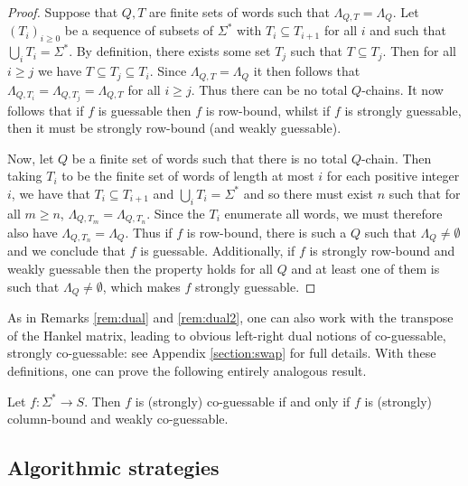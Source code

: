 \documentclass{lmcs}
\numberwithin{theorem}{section}
\begin{document}
\begin{proof} Suppose that $Q, T$ are finite sets of words such that $\Lambda_{Q, T}=\Lambda_{Q}$. Let $(T_i)_{i \geq0}$ be a sequence of subsets of $\Sigma^*$ with $T_i \subseteq T_{i+1}$ for all $i$ and such that $\bigcup_i T_i = \Sigma^*$. By definition, there exists some set $T_j$ such that $T \subseteq T_j$. Then for all $i\geq j$ we have $T \subseteq T_j \subseteq T_i$. Since $\Lambda_{Q, T}=\Lambda_{Q}$ it then follows that $\Lambda_{Q, T_i} = \Lambda_{Q, T_j} = \Lambda_{Q, T}$ for all $i \geq j$. Thus there can be no total $Q$-chains. It now follows that if $f$ is guessable then $f$ is row-bound, whilst if $f$ is strongly guessable, then it must be strongly row-bound (and weakly guessable).
	
	Now, let $Q$ be a finite set of words such that there is no total $Q$-chain. Then taking $T_i$ to be the finite set of words of length at most $i$  for each positive integer $i$, we have that $T_i \subseteq T_{i+1}$ and $\bigcup_i T_i = \Sigma^*$ and so there must exist $n$ such that for all $m\geq n$, $\Lambda_{Q, T_m} = \Lambda_{Q, T_n}$. Since the $T_i$ enumerate all words, we must therefore also have $\Lambda_{Q, T_n} = \Lambda_{Q}$.  Thus if $f$ is row-bound, there is such a $Q$ such that $\Lambda_Q \neq \emptyset$ and we conclude that $f$ is guessable. Additionally, if $f$ is strongly row-bound and weakly guessable then the property holds for all $Q$ and at least one of them is such that $\Lambda_Q \neq \emptyset$, which makes $f$ strongly guessable.
\end{proof} %

\begin{rem}
\label{rem:dual3}
As in Remarks \ref{rem:dual} and \ref{rem:dual2}, one can also work with the transpose of the Hankel matrix, leading to obvious left-right dual notions of co-guessable, strongly co-guessable: see Appendix \ref{section:swap} for full details. With these definitions, one can prove the following entirely analogous result.
\end{rem}


\begin{prop}
	\label{prop:coguessable}
	Let $f:\Sigma^* \to S$. Then $f$ is (strongly) co-guessable if and only if $f$ is (strongly) column-bound and weakly co-guessable.  
\end{prop}

\subsection{Algorithmic strategies}
\end{document}
